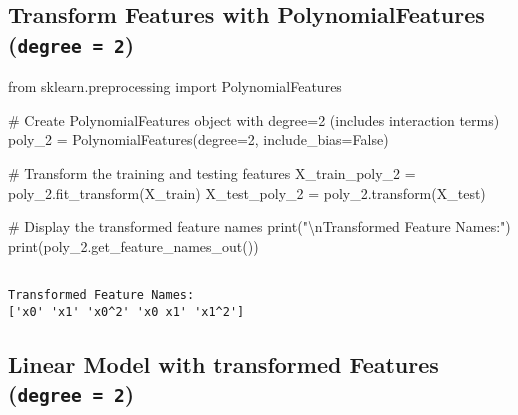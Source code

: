 \documentclass[
  letterpaper,
  DIV=11,
  numbers=noendperiod]{scrreprt}
\newenvironment{Shaded}{\begin{snugshade}}{\end{snugshade}}
\newcommand{\BuiltInTok}[1]{\textcolor[rgb]{0.00,0.23,0.31}{#1}}
\newcommand{\CharTok}[1]{\textcolor[rgb]{0.13,0.47,0.30}{#1}}
\newcommand{\CommentTok}[1]{\textcolor[rgb]{0.37,0.37,0.37}{#1}}
\newcommand{\DecValTok}[1]{\textcolor[rgb]{0.68,0.00,0.00}{#1}}
\newcommand{\ImportTok}[1]{\textcolor[rgb]{0.00,0.46,0.62}{#1}}
\newcommand{\NormalTok}[1]{\textcolor[rgb]{0.00,0.23,0.31}{#1}}
\newcommand{\OperatorTok}[1]{\textcolor[rgb]{0.37,0.37,0.37}{#1}}
\newcommand{\StringTok}[1]{\textcolor[rgb]{0.13,0.47,0.30}{#1}}
\newcommand{\VariableTok}[1]{\textcolor[rgb]{0.07,0.07,0.07}{#1}}
\begin{document}
\subsection{\texorpdfstring{Transform Features with PolynomialFeatures
(\texttt{degree\ =\ 2})}{Transform Features with PolynomialFeatures (degree = 2)}}\label{transform-features-with-polynomialfeatures-degree-2}

\begin{Shaded}
\begin{Highlighting}[]
\ImportTok{from}\NormalTok{ sklearn.preprocessing }\ImportTok{import}\NormalTok{ PolynomialFeatures}

\CommentTok{\# Create PolynomialFeatures object with degree=2 (includes interaction terms)}
\NormalTok{poly\_2 }\OperatorTok{=}\NormalTok{ PolynomialFeatures(degree}\OperatorTok{=}\DecValTok{2}\NormalTok{, include\_bias}\OperatorTok{=}\VariableTok{False}\NormalTok{)}

\CommentTok{\# Transform the training and testing features}
\NormalTok{X\_train\_poly\_2 }\OperatorTok{=}\NormalTok{ poly\_2.fit\_transform(X\_train)}
\NormalTok{X\_test\_poly\_2 }\OperatorTok{=}\NormalTok{ poly\_2.transform(X\_test)}

\CommentTok{\# Display the transformed feature names}
\BuiltInTok{print}\NormalTok{(}\StringTok{"}\CharTok{\textbackslash{}n}\StringTok{Transformed Feature Names:"}\NormalTok{)}
\BuiltInTok{print}\NormalTok{(poly\_2.get\_feature\_names\_out())}
\end{Highlighting}
\end{Shaded}

\begin{verbatim}

Transformed Feature Names:
['x0' 'x1' 'x0^2' 'x0 x1' 'x1^2']
\end{verbatim}

\subsection{\texorpdfstring{Linear Model with transformed Features
(\texttt{degree\ =\ 2})}{Linear Model with transformed Features (degree = 2)}}\label{linear-model-with-transformed-features-degree-2}
\end{document}
